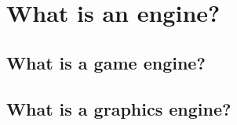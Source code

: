 \newpage
\section{What is an engine?}
\subsection{What is a game engine?}
\subsection{What is a graphics engine?}